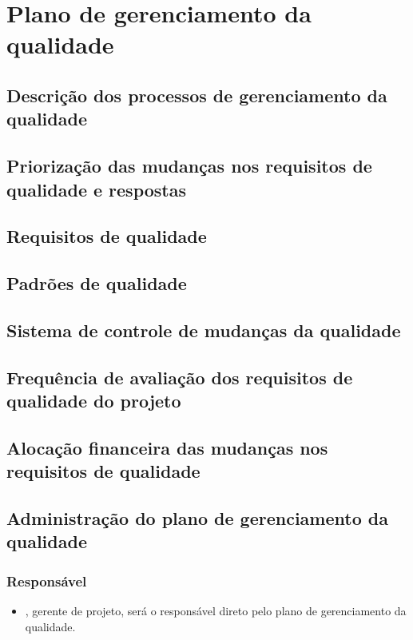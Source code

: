 \chapter{Plano de gerenciamento da qualidade}

\section{Descrição dos processos de gerenciamento da qualidade}

\section{Priorização das mudanças nos requisitos de qualidade e respostas}

\section{Requisitos de qualidade}

\section{Padrões de qualidade}

\section{Sistema de controle de mudanças da qualidade}

\section{Frequência de avaliação dos requisitos de qualidade do projeto}

\section{Alocação financeira das mudanças nos requisitos de qualidade}

\section{Administração do plano de gerenciamento da qualidade}

\subsection{Responsável}

\begin{itemize}
	\item \projectManagerName, gerente de projeto, será o responsável direto pelo plano de gerenciamento da qualidade.
\end{itemize}

